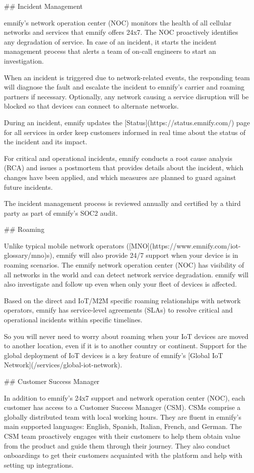 \documentclass[11pt, oneside]{article}   	%
\begin{document}
\begin{markdown}

## Incident Management

emnify's network operation center (NOC) monitors the health of all cellular networks and services that emnify offers 24x7.
The NOC proactively identifies any degradation of service.
In case of an incident, it starts the incident management process that alerts a team of on-call engineers to start an investigation.

When an incident is triggered due to network-related events, the responding team will diagnose the fault and escalate the incident to emnify’s carrier and roaming partners if necessary.
Optionally, any network causing a service disruption will be blocked so that devices can connect to alternate networks.

During an incident, emnify updates the [Status](https://status.emnify.com/) page for all services in order keep customers informed in real time about the status of the incident and its impact.

For critical and operational incidents, emnify conducts a root cause analysis (RCA) and issues a postmortem that provides details about the incident, which changes have been applied, and which measures are planned to guard against future incidents.

The incident management process is reviewed annually and certified by a third party as part of emnify’s SOC2 audit.

## Roaming

Unlike typical mobile network operators ([MNO](https://www.emnify.com/iot-glossary/mno)s), emnify will also provide 24/7 support when your device is in roaming scenarios.
The emnify network operation center (NOC) has visibility of all networks in the world and can detect network service degradation. 
emnify will also investigate and follow up even when only your fleet of devices is affected.

Based on the direct and IoT/M2M specific roaming relationships with network operators, emnify has service-level agreements (SLAs) to resolve critical and operational incidents within specific timelines.

So you will never need to worry about roaming when your IoT devices are moved to another location, even if it is to another country or continent.
Support for the global deployment of IoT devices is a key feature of emnify's [Global IoT Network](/services/global-iot-network).

## Customer Success Manager

In addition to emnify’s 24x7 support and network operation center (NOC), each customer has access to a Customer Success Manager (CSM).
CSMs comprise a globally distributed team with local working hours.
They are fluent in emnify's main supported languages: English, Spanish, Italian, French, and German.
The CSM team proactively engages with their customers to help them obtain value from the product and guide them through their journey.
They also conduct onboardings to get their customers acquainted with the platform and help with setting up integrations.

\end{markdown}
\end{document}
